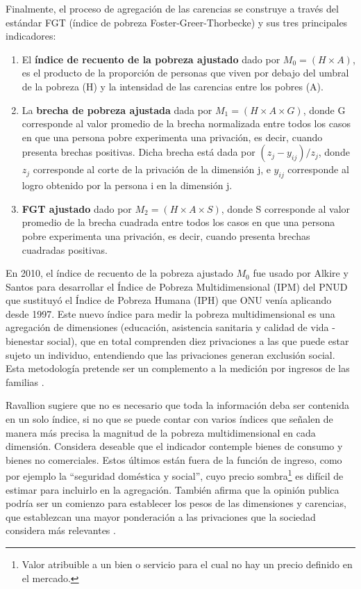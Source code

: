 \documentclass[12pt,letterpaper,spanish]{article}
\begin{document}
Finalmente, el proceso de agregación de las carencias se construye a través del estándar FGT (índice de pobreza Foster-Greer-Thorbecke) \cite{Alkire2007CountingMeasurement} y sus tres principales indicadores: 
\begin{enumerate}
    \item El \textbf{índice de recuento de la pobreza ajustado} dado por $M_{0}=(H\times A)$, es el producto de la proporción de personas que viven por debajo del umbral de la pobreza (H) y la intensidad de las carencias entre los pobres (A).
    \item La \textbf{brecha de pobreza ajustada} dada por $M_{1}=(H\times A\times G)$, donde G corresponde al valor promedio de la brecha normalizada entre todos los casos en que una persona pobre experimenta una privación, es decir, cuando presenta brechas positivas. Dicha brecha está dada por $(z_{j}-y_{ij})/z_{j}$, donde $z_{j}$ corresponde al corte de la privación de la dimensión j, e $y_{ij}$ corresponde al logro obtenido por la persona i en la dimensión j. 
    \item \textbf{FGT ajustado} dado por $M_{2}=(H\times A\times S)$, donde S corresponde al valor promedio de la brecha cuadrada entre todos los casos en que una persona pobre experimenta una privación, es decir, cuando presenta brechas cuadradas positivas.
\end{enumerate}

En 2010, el índice de recuento de la pobreza ajustado $M_{0}$ fue usado por Alkire y Santos para desarrollar el Índice de Pobreza Multidimensional (IPM) del PNUD \cite{Alkire2011UnderstandingsMeasurement} que sustituyó el Índice de Pobreza Humana (IPH) que ONU venía aplicando desde 1997. Este nuevo índice para medir la pobreza multidimensional es una agregación de dimensiones (educación, asistencia sanitaria y calidad de vida - bienestar social), que en total comprenden diez privaciones a las que puede estar sujeto un individuo, entendiendo que las privaciones generan exclusión social. Esta metodología pretende ser un complemento a la medición por ingresos de las familias \cite{PNUD2015The1}.

Ravallion sugiere que no es necesario que toda la información deba ser contenida en un solo índice, si no que se puede contar con varios índices que señalen de manera más precisa la magnitud de la pobreza multidimensional en cada dimensión. Considera deseable que el indicador contemple bienes de consumo y bienes no comerciales. Estos últimos están fuera de la función de ingreso, como por ejemplo la “seguridad doméstica y social”, cuyo precio sombra\footnote{Valor atribuible a un bien o servicio para el cual no hay un precio definido en el mercado.} es difícil de estimar para incluirlo en la agregación. También afirma que la opinión publica podría ser un comienzo para establecer los pesos de las dimensiones y carencias, que establezcan una mayor ponderación a las privaciones que la sociedad considera más relevantes \cite{Ravallion2011OnPoverty}.
\end{document}
